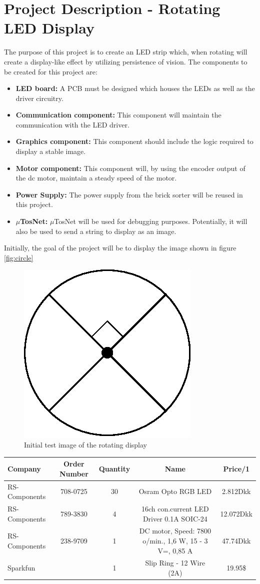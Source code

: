 \documentclass[a4paper,10pt]{article}
\title{}
\author{}
\begin{document}
	\section{Project Description - Rotating LED Display}
	The purpose of this project is to create an LED strip which, when rotating will create a display-like effect by utilizing persistence of vision.
	The components to be created for this project are:
	\begin{itemize}
		\item \textbf{LED board:} A PCB must be designed which houses the LEDs as well as the driver circuitry.
		\item \textbf{Communication component:} This component will maintain the communication with the LED driver.
		\item \textbf{Graphics component:} This component should include the logic required to display a stable image.
		\item \textbf{Motor component:} This component will, by using the encoder output of the dc motor, maintain a steady speed of the motor.
		\item \textbf{Power Supply:} The power supply from the brick sorter will be reused in this project.
		\item \textbf{$\mu$TosNet:} $\mu$TosNet will be used for debugging purposes.
		Potentially, it will also be used to send a string to display as an image.
	\end{itemize}
	Initially, the goal of the project will be to display the image shown in figure \ref{fig:circle}
	
	\begin{figure}
		\centering
		\includegraphics[width=.5\linewidth]{images/circle}
		\caption{Initial test image of the rotating display}
		\label{key}
	\end{figure}
	\begin{table}
		\begin{tabular}{l|c|c|c|c}
			Company & Order Number & Quantity & Name & Price/1\\
			\hline
			RS-Components & 708-0725 & 30 & Osram Opto RGB LED & 2.812Dkk\\
			\hline
			RS-Components & 789-3830 & 4 & 16ch con.current LED Driver 0.1A SOIC-24 & 12.072Dkk\\
			\hline
			RS-Components & 238-9709 & 1 & DC motor, Speed: 7800 o/min., 1,6 W, 15 - 3 V=, 0,85 A & 47.74Dkk\\
			\hline
			Sparkfun & & 1 & Slip Ring - 12 Wire (2A) & 19.95\$
		\end{tabular}
	\end{table}
\end{document}
